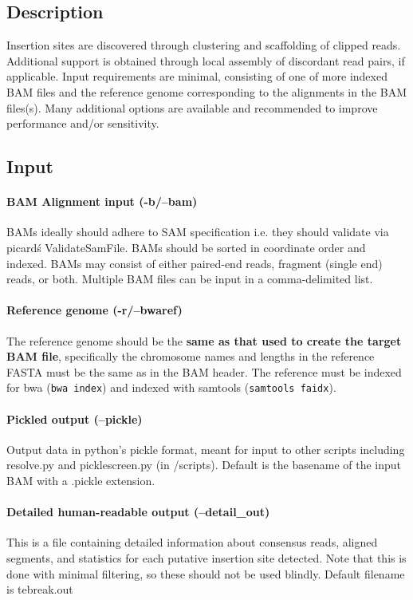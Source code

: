\documentclass[letterpaper,11pt]{article}
\begin{document}
\subsection{Description}
Insertion sites are discovered through clustering and scaffolding of clipped reads. Additional support is obtained through local assembly of discordant read pairs, if applicable. Input requirements are minimal, consisting of one of more indexed BAM files and the reference genome corresponding to the alignments in the BAM files(s). Many additional options are available and recommended to improve performance and/or sensitivity.

\subsection{Input}
\paragraph{BAM Alignment input (-b/--bam)}
	BAMs ideally should adhere to SAM specification i.e. they should validate via picard\'s ValidateSamFile. BAMs should be sorted in coordinate order and indexed. BAMs may consist of either paired-end reads, fragment (single end) reads, or both. Multiple BAM files can be input in a comma-delimited list.
	
\paragraph{Reference genome (-r/--bwaref)}
	The reference genome should be the \textbf{same as that used to create the target BAM file}, specifically the chromosome names and lengths in the reference FASTA must be the same as in the BAM header. The reference must be indexed for bwa (\texttt{bwa index}) and indexed with samtools (\texttt{samtools faidx}).

\paragraph{Pickled output (--pickle)}
Output data in python's pickle format, meant for input to other scripts including resolve.py and picklescreen.py (in /scripts). Default is the basename of the input BAM with a .pickle extension.

\paragraph{Detailed human-readable output (--detail\_out)}
This is a file containing detailed information about consensus reads, aligned segments, and statistics for each putative insertion site detected. Note that this is done with minimal filtering, so these should not be used blindly. Default filename is tebreak.out
\end{document}
